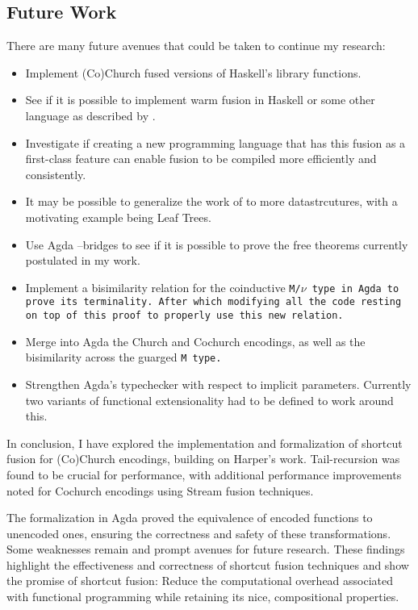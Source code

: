 \subsection*{Future Work}
There are many future avenues that could be taken to continue my research:
\begin{itemize}[noitemsep]
    \item Implement (Co)Church fused versions of Haskell's library functions.
    \item See if it is possible to implement warm fusion in Haskell or some other language as described by \cite{Launchbury1995}.
    \item Investigate if creating a new programming language that has this fusion as a first-class feature can enable fusion to be compiled more efficiently and consistently.
    \item It may be possible to generalize the work of \cite{Coutts2007} to more datastrcutures, with a motivating example being Leaf Trees.
    \item Use Agda --bridges to see if it is possible to prove the free theorems currently postulated in my work.
    \item Implement a bisimilarity relation for the coinductive \tt{M}/$\nu$  type in Agda to prove its terminality. After which modifying all the code resting on top of this proof to properly use this new relation.
    \item Merge into Agda the Church and Cochurch encodings, as well as the bisimilarity across the guarged \tt{M} type.
    \item Strengthen Agda's typechecker with respect to implicit parameters. Currently two variants of functional extensionality had to be defined to work around this.
\end{itemize}
In conclusion, I have explored the implementation and formalization of shortcut fusion for (Co)Church encodings, building on Harper's work.
Tail-recursion was found to be crucial for performance, with additional performance improvements noted for Cochurch encodings using Stream fusion techniques.

The formalization in Agda proved the equivalence of encoded functions to unencoded ones, ensuring the correctness and safety of these transformations.
Some weaknesses remain and prompt avenues for future research.
These findings highlight the effectiveness and correctness of shortcut fusion techniques and show the promise of shortcut fusion: Reduce the computational overhead associated with functional programming while retaining its nice, compositional properties.
